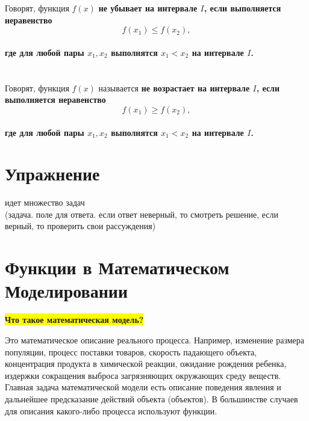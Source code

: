 \documentclass[a4paper,14pt]{report}
\begin{document}
\section*{ }
\noindent
Говорят, функция $f(x)$ \bf не убывает \rm на интервале $I$, если выполняется неравенство \[ f(x_1) \le f(x_2), \] \\ где для любой пары $x_1, x_2$ выполнятся $x_1 < x_2$ на интервале $I$.
\section*{ }
\noindent
Говорят, функция $f(x)$ называется \bf не возрастает \rm на интервале $I$, если выполняется неравенство \[ f(x_1) \ge f(x_2), \] \\ где для любой пары $x_1, x_2$ выполнятся $x_1 < x_2$ на интервале $I$.

\section*{ Упражнение}
идет множество задач\\
(задача. поле для ответа. если ответ неверный, то смотреть решение, если верный, то проверить свои рассуждения)


\section*{ \colorbox{light-blue}{Функции в Математическом Моделировании}}

\colorbox{yellow}{\bf Что такое математическая модель?}\par
\vspace{.5cm}
Это математическое описание реального процесса. Например, изменение размера популяции, процесс поставки товаров, скорость падающего объекта, концентрация продукта в химической реакции, ожидание рождения ребенка, издержки сокращения выброса загрязняющих окружающих среду веществ. Главная задача математической модели есть описание поведения явления и дальнейшее предсказание действий объекта (объектов). В большинстве случаев для описания какого-либо процесса используют функции.\\
\end{document}
